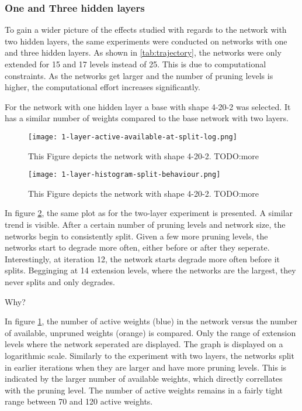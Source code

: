 \subsubsection{One and Three hidden layers}
To gain a wider picture of the effects studied with regards to the network with two hidden layers, the same experiments were conducted on networks with one and three hidden layers.
As shown in \ref{tab:trajectory}, the networks were only extended for 15 and 17 levels instead of 25. 
This is due to computational constraints. As the networks get larger and the number of pruning levels is higher, the computational effort increases significantly.

For the network with one hidden layer a base with shape 4-20-2 was selected.
It has a similar number of weights compared to the base network with two layers.

\begin{figure}[ht]
    \centering
    \texttt{[image: 1-layer-active-available-at-split-log.png]}
    \caption{This Figure depicts the network with shape 4-20-2.
    TODO:more }
    \label{fig:1layer-active}
\end{figure}

\begin{figure}[ht]
    \centering
    \texttt{[image: 1-layer-histogram-split-behaviour.png]}
    \caption{This Figure depicts the network with shape 4-20-2.
    TODO:more }
    \label{fig:1layer-histogram}
\end{figure}

In figure \ref{fig:1layer-histogram}, the same plot as for the two-layer experiment is presented.
A similar trend is visible.
After a certain number of pruning levels and network size, the networks begin to consistently split.
Given a few more pruning levels, the networks start to degrade more often, either before or after they seperate.
Interestingly, at iteration 12, the network starts degrade more often before it splits.
Begginging at 14 extension levels, where the networks are the largest, they never splits and only degrades.

Why? 

In figure \ref{fig:1layer-active}, the number of active weights (blue) in the network versus the number of available, unpruned weights (orange) is compared.
Only the range of extension levels where the network seperated are displayed.
The graph is displayed on a logarithmic scale.
Similarly to the experiment with two layers, the networks split in earlier iterations when they are larger and have more pruning levels.
This is indicated by the larger number of available weights, which directly correllates with the pruning level.
The number of active weights remains in a fairly tight range between 70 and 120 active weights.

